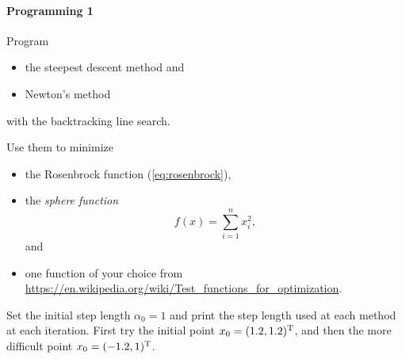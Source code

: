 \paragraph{Programming 1}  %
Program
\begin{itemize}
  \item the steepest descent method and
  \item Newton's method
\end{itemize}
with the backtracking line search.

Use them to minimize
\begin{itemize}
  \item the Rosenbrock function (\ref{eq:rosenbrock}),
  \item the \emph{sphere function}
    \[
      f(x) = \sum_{i=1}^n x_i^2,
    \]
    and
  \item one function of your choice from
    \url{https://en.wikipedia.org/wiki/Test_functions_for_optimization}.
\end{itemize}
Set the initial step length $\alpha_0=1$ and print the step length used at
each method at each iteration. First try the initial point $x_0=(1.2,
1.2)^{\text{\upshape T}}$, and then the more difficult point $x_0=(-1.2, 1)^{\text{\upshape T}}$.



